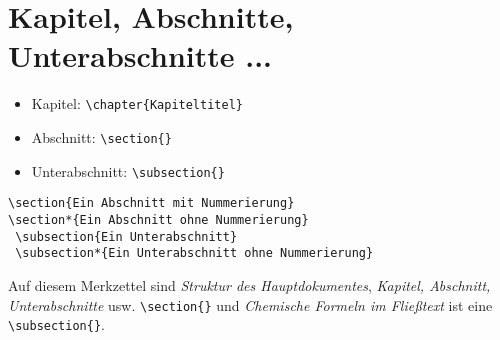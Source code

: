 \section{Kapitel, Abschnitte, Unterabschnitte ...}

\begin{itemize}
 \item Kapitel: \lstinline$\chapter{Kapiteltitel}$
 \item Abschnitt: \lstinline$\section{}$
 \item Unterabschnitt: \lstinline$\subsection{}$
\end{itemize}

\begin{lstlisting}
\section{Ein Abschnitt mit Nummerierung}
\section*{Ein Abschnitt ohne Nummerierung}
 \subsection{Ein Unterabschnitt}
 \subsection*{Ein Unterabschnitt ohne Nummerierung}
\end{lstlisting}

Auf diesem Merkzettel sind \emph{Struktur des Hauptdokumentes},
\emph{Kapitel, Abschnitt, Unterabschnitte} usw. \lstinline$\section{}$
und \emph{Chemische Formeln im Fließtext} ist eine \lstinline$\subsection{}$.

